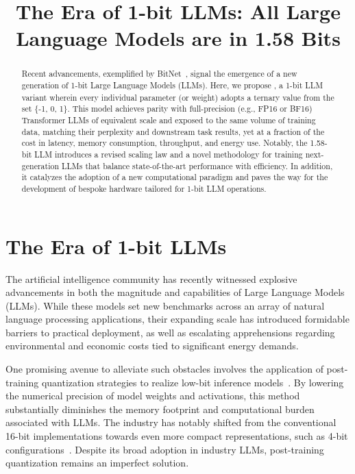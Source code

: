 \title{The Era of 1-bit LLMs: All Large Language Models are in 1.58 Bits}

\begin{abstract}
Recent advancements, exemplified by BitNet~\cite{bitnet}, signal the emergence of a new generation of 1-bit Large Language Models (LLMs). Here, we propose \textbf{}, a 1-bit LLM variant wherein every individual parameter (or weight) adopts a ternary value from the set \{-1, 0, 1\}. This model achieves parity with full-precision (e.g., FP16 or BF16) Transformer LLMs of equivalent scale and exposed to the same volume of training data, matching their perplexity and downstream task results, yet at a fraction of the cost in latency, memory consumption, throughput, and energy use. Notably, the 1.58-bit LLM introduces a revised scaling law and a novel methodology for training next-generation LLMs that balance state-of-the-art performance with efficiency. In addition, it catalyzes the adoption of a new computational paradigm and paves the way for the development of bespoke hardware tailored for 1-bit LLM operations.
\end{abstract}

\section{The Era of 1-bit LLMs}

The artificial intelligence community has recently witnessed explosive advancements in both the magnitude and capabilities of Large Language Models (LLMs). While these models set new benchmarks across an array of natural language processing applications, their expanding scale has introduced formidable barriers to practical deployment, as well as escalating apprehensions regarding environmental and economic costs tied to significant energy demands.

One promising avenue to alleviate such obstacles involves the application of post-training quantization strategies to realize low-bit inference models~\cite{smoothquant, gptq, quip, quip_sharp}. By lowering the numerical precision of model weights and activations, this method substantially diminishes the memory footprint and computational burden associated with LLMs. The industry has notably shifted from the conventional 16-bit implementations towards even more compact representations, such as 4-bit configurations~\cite{gptq, awq}. Despite its broad adoption in industry LLMs, post-training quantization remains an imperfect solution.

